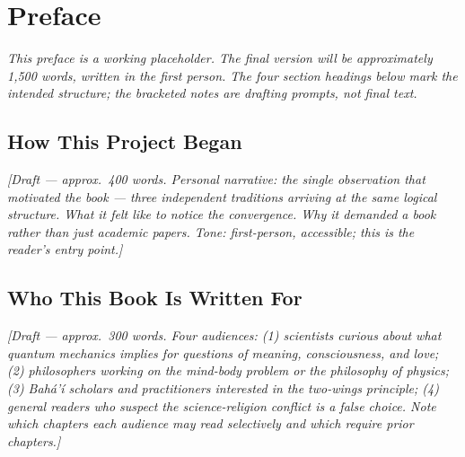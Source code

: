 \chapter*{Preface}

\bigskip

\noindent\textit{This preface is a working placeholder. The final version will
be approximately 1{,}500 words, written in the first person. The four section
headings below mark the intended structure; the bracketed notes are drafting
prompts, not final text.}

\bigskip\bigskip

\section*{How This Project Began}

\noindent\textit{[Draft --- approx.\ 400 words. Personal narrative: the
single observation that motivated the book --- three independent traditions
arriving at the same logical structure. What it felt like to notice the
convergence. Why it demanded a book rather than just academic papers. Tone:
first-person, accessible; this is the reader's entry point.]}

\bigskip

\section*{Who This Book Is Written For}

\noindent\textit{[Draft --- approx.\ 300 words. Four audiences: (1)
scientists curious about what quantum mechanics implies for questions of
meaning, consciousness, and love; (2) philosophers working on the mind-body
problem or the philosophy of physics; (3) Bahá'í scholars and practitioners
interested in the two-wings principle; (4) general readers who suspect the
science-religion conflict is a false choice. Note which chapters each
audience may read selectively and which require prior chapters.]}

